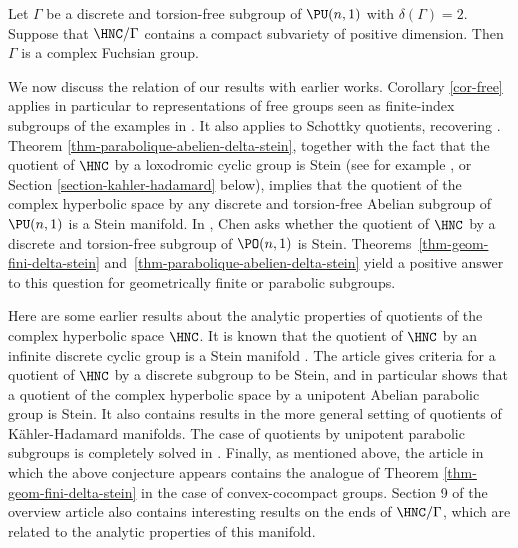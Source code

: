 \begin{theoremIntro}\label{thm-delta2}
Let $\Gamma$ be a discrete and torsion-free subgroup of $\PU(n,1)$ with $\delta(\Gamma)=2$. Suppose that $\HNC/\Gamma$ contains a compact subvariety of positive dimension. Then $\Gamma$ is a complex Fuchsian group.
\end{theoremIntro}

We now discuss the relation of our results with earlier works. Corollary \ref{cor-free} applies in particular to representations of free groups seen as finite-index subgroups of the examples in \cite{goldmanComplexHyperbolicIdeal1992,falbelModuliSpaceModular2003}. It also applies to Schottky quotients, recovering \cite[Th.\,4.3]{miebachSchottkyGroupActions2018}. Theorem \ref{thm-parabolique-abelien-delta-stein}, together with the fact that the quotient of $\HNC$ by a loxodromic cyclic group is Stein (see for example \cite{defabritiisFamilyComplexManifolds1998manuel}, \cite{chenDiscreteGroupsHolomorphic2013} or Section \ref{section-kahler-hadamard} below), implies that the quotient of the complex hyperbolic space by any discrete and torsion-free Abelian subgroup of $\PU(n,1)$ is a Stein manifold. In \cite{chenDiscreteGroupsHolomorphic2013}, Chen asks whether the quotient of $\HNC$ by a discrete and torsion-free subgroup of $\PO(n,1)$ is Stein. Theorems~\ref{thm-geom-fini-delta-stein} and~\ref{thm-parabolique-abelien-delta-stein} yield a positive answer to this question for geometrically finite or parabolic subgroups.

Here are some earlier results about the analytic properties of quotients of the complex hyperbolic space $\HNC$. It is known that the quotient of $\HNC$ by an infinite discrete cyclic group is a Stein manifold \cite{defabritiisFamilyComplexManifolds1998manuel,defabritiisQuotientsUnitBall2001manuel,miebachQuotientsBoundedHomogeneous2010}. The article \cite{chenDiscreteGroupsHolomorphic2013} gives criteria for a quotient of $\HNC$ by a discrete subgroup to be Stein, and in particular shows that a quotient of the complex hyperbolic space by a unipotent Abelian parabolic group is Stein. It also contains results in the more general setting of quotients of Kähler-Hadamard manifolds. The case of quotients by unipotent parabolic subgroups is completely solved in \cite{miebachQuotientsBoundedHomogeneous2024}. Finally, as mentioned above, the article \cite{deyNoteComplexhyperbolicKleinian2020} in which the above conjecture appears contains the analogue of Theorem \ref{thm-geom-fini-delta-stein} in the case of convex-cocompact groups. Section 9 of the overview article \cite{kapovichSurveyComplexHyperbolic2022} also contains interesting results on the ends of $\HNC/\Gamma$, which are related to the analytic properties of this manifold.

